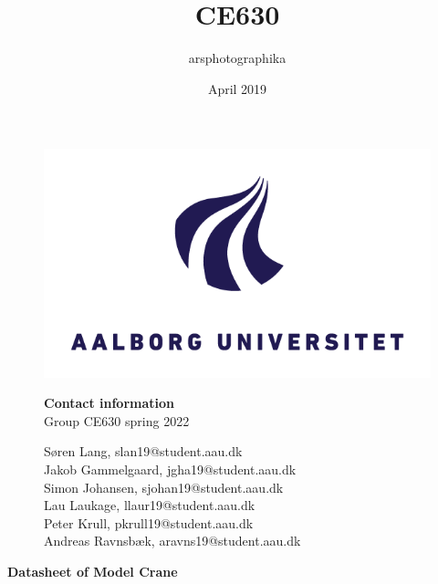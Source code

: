 \documentclass[a4paper,12pt,oneside,pdflatex,italian,final,twocolumn]{article}
\title{CE630}
\author{arsphotographika }
\date{April 2019}
\begin{document}
\pagestyle{fancy}

\chead {\today}


\onecolumn

\begin{figure}[H]
\begin{minipage}{0.47\textwidth}
\centering
\includegraphics[width=.7\textwidth,left,]{pictures/logo.png}

\end{minipage}
\hfill
\begin{minipage}{0.47\textwidth}
\raggedleft
\textbf{Contact information}\\
Group CE630 spring 2022

Søren Lang,
slan19@student.aau.dk\\
Jakob Gammelgaard,
jgha19@student.aau.dk\\
Simon Johansen,
sjohan19@student.aau.dk\\
Lau Laukage,
llaur19@student.aau.dk\\
Peter Krull,
pkrull19@student.aau.dk\\
Andreas Ravnsbæk,
aravns19@student.aau.dk\\

\end{minipage}
\end{figure}

{\huge\textbf{Datasheet of Model Crane}}
\end{document}
